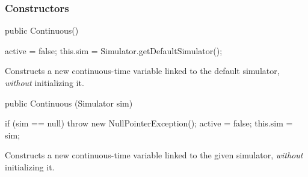 \subsubsection* {Constructors}
\begin{code}

   public Continuous() \begin{hide} {
      active = false;
      this.sim = Simulator.getDefaultSimulator();
   } \end{hide}
\end{code}
   \begin{tabb} Constructs a new continuous-time variable 
   linked to the default simulator, {\em without\/} initializing it.
   \end{tabb}
\begin{code}

   public Continuous (Simulator sim) \begin{hide} {
       if (sim == null)
          throw new NullPointerException();
      active = false;
      this.sim = sim;
   } \end{hide}
\end{code}
   \begin{tabb} Constructs a new continuous-time variable linked to
     the given simulator, {\em without\/}
    initializing it.
   \end{tabb}
\begin{htmlonly}
\end{htmlonly}
